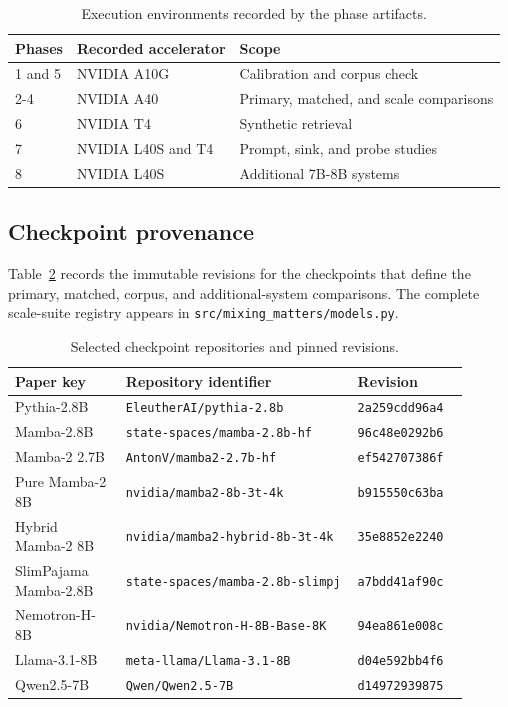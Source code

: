 \documentclass{article}
\begin{document}
\begin{table}[t]
\caption{Execution environments recorded by the phase artifacts.}
\label{tab:compute}
\centering
\small
\begin{tabular}{@{}lll@{}}
\toprule
Phases & Recorded accelerator & Scope \\
\midrule
1 and 5 & NVIDIA A10G & Calibration and corpus check \\
2-4 & NVIDIA A40 & Primary, matched, and scale comparisons \\
6 & NVIDIA T4 & Synthetic retrieval \\
7 & NVIDIA L40S and T4 & Prompt, sink, and probe studies \\
8 & NVIDIA L40S & Additional 7B-8B systems \\
\bottomrule
\end{tabular}
\end{table}

\subsection{Checkpoint provenance}

Table~\ref{tab:checkpoints} records the immutable revisions for the checkpoints that define the primary, matched, corpus, and additional-system comparisons.
The complete scale-suite registry appears in \texttt{src/mixing\_matters/models.py}.

\begin{table}[t]
\caption{Selected checkpoint repositories and pinned revisions.}
\label{tab:checkpoints}
\centering
\scriptsize
\begin{tabular}{@{}p{0.22\linewidth}p{0.46\linewidth}p{0.22\linewidth}@{}}
\toprule
Paper key & Repository identifier & Revision \\
\midrule
Pythia-2.8B & \texttt{EleutherAI/pythia-2.8b} & \texttt{2a259cdd96a4} \\
Mamba-2.8B & \texttt{state-spaces/mamba-2.8b-hf} & \texttt{96c48e0292b6} \\
Mamba-2 2.7B & \texttt{AntonV/mamba2-2.7b-hf} & \texttt{ef542707386f} \\
Pure Mamba-2 8B & \texttt{nvidia/mamba2-8b-3t-4k} & \texttt{b915550c63ba} \\
Hybrid Mamba-2 8B & \texttt{nvidia/mamba2-hybrid-8b-3t-4k} & \texttt{35e8852e2240} \\
SlimPajama Mamba-2.8B & \texttt{state-spaces/mamba-2.8b-slimpj} & \texttt{a7bdd41af90c} \\
Nemotron-H-8B & \texttt{nvidia/Nemotron-H-8B-Base-8K} & \texttt{94ea861e008c} \\
Llama-3.1-8B & \texttt{meta-llama/Llama-3.1-8B} & \texttt{d04e592bb4f6} \\
Qwen2.5-7B & \texttt{Qwen/Qwen2.5-7B} & \texttt{d14972939875} \\
\bottomrule
\end{tabular}
\end{table}
\end{document}
